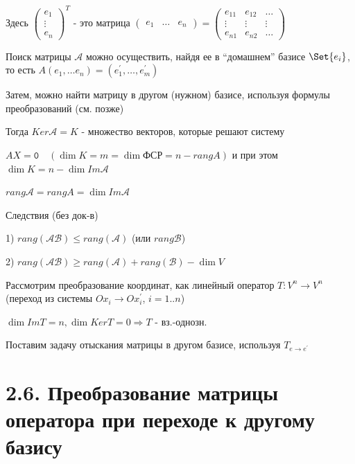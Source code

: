 \documentclass[12pt]{article}
\begin{document}
    Здесь $\begin{pmatrix}
         e_1 \\
         \vdots \\
         e_n
    \end{pmatrix}^T$ - это матрица $\begin{pmatrix}
         e_1 & \dots & e_n
    \end{pmatrix} = \begin{pmatrix}
         e_{11} & e_{12} & \dots \\
         \vdots & \vdots & \vdots \\
         e_{n1} & e_{n2} & \dots
    \end{pmatrix}$

    \Nota Поиск матрицы $\mathcal{A}$ можно осуществить, найдя ее в \enquote{домашнем} базисе $\Set{e_i}$, то есть $A (e_1, \dots e_n) = (e_1^\prime, \dots, e_m^\prime)$

    Затем, можно найти матрицу в другом (нужном) базисе, используя формулы преобразований (см. \th позже)

    Тогда $Ker \mathcal{A} = K$ - множество векторов, которые решают систему

    $AX = \texttt{0} \quad (\dim K = m = \dim \text{ФСР} = n - rang A)$ и при этом $\dim K = n - \dim Im \mathcal{A}$

    $rang \mathcal{A} = rang A = \dim Im \mathcal{A}$

    Следствия (без док-в)

    1) $rang(\mathcal{AB}) \leq rang(\mathcal{A})$ (или $rang \mathcal{B}$)

    2) $rang(\mathcal{AB}) \geq rang(\mathcal{A}) + rang(\mathcal{B}) - \dim V$

    \Nota Рассмотрим преобразование координат, как линейный оператор $T : V^n \rightarrow V^n$ (переход из системы $Ox_i \rightarrow Ox_i^\prime$, $i = 1..n$)

    $\dim Im T = n, \dim Ker T = 0 \Longrightarrow T$ - вз.-однозн.

    Поставим задачу отыскания матрицы в другом базисе, используя $T_{e \to e^\prime}$

    \section{2.6. Преобразование матрицы оператора при переходе к другому базису}

    \hypertarget{transformationtodifferentbasis}{}
\end{document}

